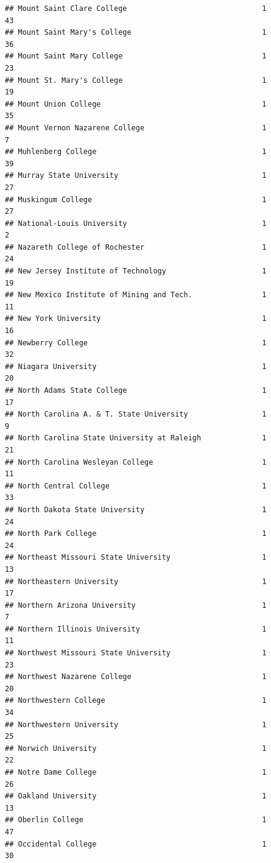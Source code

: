 \documentclass[
]{article}
\begin{document}
\begin{verbatim}
## Mount Saint Clare College                               1          43
## Mount Saint Mary's College                              1          36
## Mount Saint Mary College                                1          23
## Mount St. Mary's College                                1          19
## Mount Union College                                     1          35
## Mount Vernon Nazarene College                           1           7
## Muhlenberg College                                      1          39
## Murray State University                                 1          27
## Muskingum College                                       1          27
## National-Louis University                               1           2
## Nazareth College of Rochester                           1          24
## New Jersey Institute of Technology                      1          19
## New Mexico Institute of Mining and Tech.                1          11
## New York University                                     1          16
## Newberry College                                        1          32
## Niagara University                                      1          20
## North Adams State College                               1          17
## North Carolina A. & T. State University                 1           9
## North Carolina State University at Raleigh              1          21
## North Carolina Wesleyan College                         1          11
## North Central College                                   1          33
## North Dakota State University                           1          24
## North Park College                                      1          24
## Northeast Missouri State University                     1          13
## Northeastern University                                 1          17
## Northern Arizona University                             1           7
## Northern Illinois University                            1          11
## Northwest Missouri State University                     1          23
## Northwest Nazarene College                              1          20
## Northwestern College                                    1          34
## Northwestern University                                 1          25
## Norwich University                                      1          22
## Notre Dame College                                      1          26
## Oakland University                                      1          13
## Oberlin College                                         1          47
## Occidental College                                      1          30

\end{verbatim}
\end{document}
